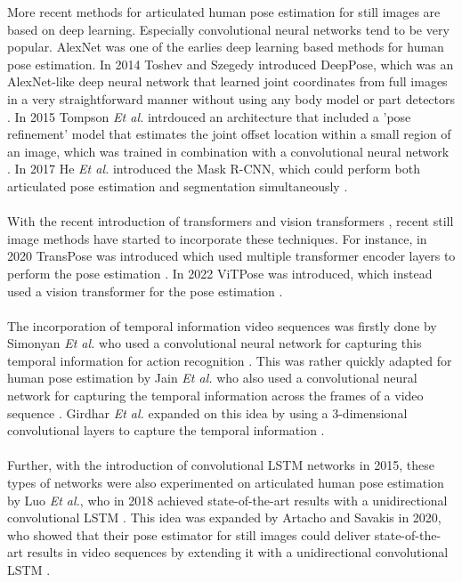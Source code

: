 \documentclass[./main.tex]{subfiles}
\begin{document}
More recent methods for articulated human pose estimation for still images are based on deep learning. Especially convolutional neural networks \cite{lecun1995convolutional} tend to be very popular. AlexNet \cite{krizhevsky2017imagenet} was one of the earlies deep learning based methods for human pose estimation. In 2014 Toshev and Szegedy introduced DeepPose, which was an AlexNet-like deep neural network that learned joint coordinates from full images in a very straightforward manner without using any body model or part detectors \cite{Toshev_2014, Chen_2020}. In 2015 Tompson \textit{Et al.} intrdouced an architecture that included a 'pose refinement' model that estimates the joint offset location within a small region of an image, which was trained in combination with a convolutional neural network \cite{tompson2015efficient}. In 2017 He \textit{Et al.} introduced the Mask R-CNN, which could perform both articulated pose estimation and segmentation simultaneously \cite{https://doi.org/10.48550/arxiv.1703.06870}.
\\
\\
With the recent introduction of transformers \cite{https://doi.org/10.48550/arxiv.1706.03762} and vision transformers \cite{dosovitskiy2021image}, recent still image methods have started to incorporate these techniques. For instance, in 2020 TransPose was introduced which used multiple transformer encoder layers to perform the pose estimation \cite{https://doi.org/10.48550/arxiv.2012.14214}. In 2022 ViTPose was introduced, which instead used a vision transformer for the pose estimation \cite{https://doi.org/10.48550/arxiv.2204.12484}.
\\
\\
The incorporation of temporal information video sequences was firstly done by Simonyan \textit{Et al.} who used a convolutional neural network for capturing this temporal information for action recognition \cite{simonyan2014twostream}. This was rather quickly adapted for human pose estimation by Jain \textit{Et al.} who also used a convolutional neural network for capturing the temporal information across the frames of a video sequence \cite{https://doi.org/10.48550/arxiv.1506.02897, jain2014modeep}. Girdhar \textit{Et al.} expanded on this idea by using a 3-dimensional convolutional layers to capture the temporal information \cite{https://doi.org/10.48550/arxiv.1712.09184}.
\\
\\
Further, with the introduction of convolutional LSTM networks \cite{conv_lstm} in 2015, these types of networks were also experimented on articulated human pose estimation by Luo \textit{Et al.}, who in 2018 achieved state-of-the-art results with a unidirectional convolutional LSTM \cite{https://doi.org/10.48550/arxiv.1712.06316}. This idea was expanded by Artacho and Savakis in 2020, who showed that their pose estimator for still images could deliver state-of-the-art results in video sequences by extending it with a unidirectional convolutional LSTM \cite{https://doi.org/10.48550/arxiv.2001.08095}.
\end{document}
